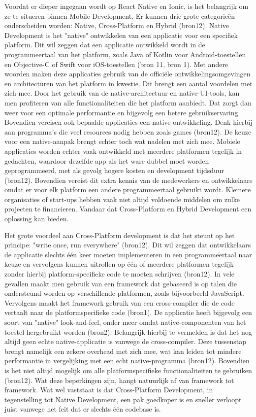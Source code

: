 Voordat er dieper ingegaan wordt op React Native en Ionic, is het belangrijk om ze te situeren binnen Mobile Development. Er kunnen drie grote categorieën onderscheiden worden: Native, Cross-Platform en Hybrid (bron12). Native Development is het "native" ontwikkelen van een applicatie voor een specifiek platform. Dit wil zeggen dat een applicatie ontwikkeld wordt in de programmeertaal van het platform, zoals Java of Kotlin voor Android-toestellen en Objective-C of Swift voor iOS-toestellen (bron 11, bron 1). Met andere woorden maken deze applicaties gebruik van de officiële ontwikkelingsomgevingen en architecturen van het platform in kwestie. Dit brengt een aantal voordelen met zich mee. Door het gebruik van de native-architectuur en native-UI-tools, kan men profiteren van alle functionaliteiten die het platform aanbiedt. Dat zorgt dan weer voor een optimale performantie en bijgevolg een betere gebruikservaring. Bovendien vereisen ook bepaalde applicaties een native ontwikkeling. Denk hierbij aan programma's die veel resources nodig hebben zoals games (bron12). De keuze voor een native-aanpak brengt echter toch wat nadelen met zich mee. Mobiele applicaties worden echter vaak ontwikkeld met meerdere platformen tegelijk in gedachten, waardoor dezelfde app als het ware dubbel moet worden geprogrammeerd, met als gevolg hogere kosten en development tijdsduur (bron12). Bovendien vereist dit extra kennis van de medewerkers en ontwikkelaars omdat er voor elk platform een andere programmeertaal gebruikt wordt. Kleinere organisaties of start-ups hebben vaak niet altijd voldoende middelen om zulke projecten te financieren. Vandaar dat Cross-Platform en Hybrid Development een oplossing kan bieden.

Het grote voordeel aan Cross-Platform development is dat het steunt op het principe: "write once, run everywhere" (bron12). Dit wil zeggen dat ontwikkelaars de applicatie slechts één keer moeten implementeren in een programmeertaal naar keuze en vervolgens kunnen uitrollen op één of meerdere platformen tegelijk zonder hierbij platform-specifieke code te moeten schrijven (bron12). In vele gevallen maakt men gebruik van een framework dat gebaseerd is op talen die ondersteund worden op verschillende platformen, zoals bijvoorbeeld JavaScript. Vervolgens maakt het framework gebruik van een cross-compiler die de code vertaalt naar de platformspecifieke code (bron1). De applicatie heeft bijgevolg een soort van "native" look-and-feel, onder meer omdat native-componenten van het toestel hergebruikt worden (bron2). Belangrijk hierbij te vermelden is dat het nog altijd geen echte native-applicatie is vanwege de cross-compiler. Deze tussenstap brengt namelijk een zekere overhead met zich mee, wat kan leiden tot mindere performantie in vergelijking met een echt native-programma (bron12). Bovendien is het niet altijd mogelijk om alle platformspecifieke functionaliteiten te gebruiken (bron12). Wat deze beperkingen zijn, hangt natuurlijk af van framework tot framework. Wat wel vaststaat is dat Cross-Platform Development, in tegenstelling tot Native Development, een pak goedkoper is en sneller verloopt juist vanwege het feit dat er slechts één codebase is.

